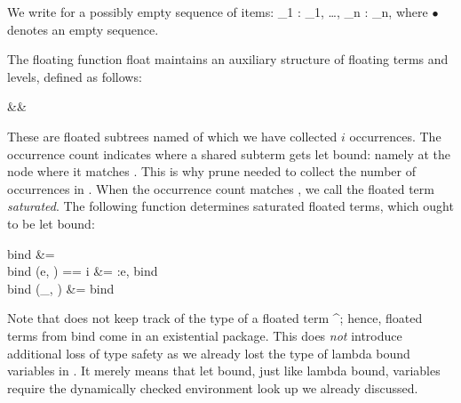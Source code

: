 We write \<\overline{\nu : \uT}\> for a possibly empty sequence of items: \<\nu_1 : \uT_1, \ldots, \nu_n : \uT_n\>, where $\bullet$ denotes an empty sequence. 

The floating function \<float\> maintains an auxiliary structure of floating terms and levels, defined as follows:
%
\begin{haskell*}
  \Gamma &{}\to{}& \float{} 
          {}\mid{} \float{}\cdot
          {}\mid{} \float{}\ell
\end{haskell*}
%
These are floated subtrees named \<\nu\> of which we have collected $i$ occurrences. The occurrence count indicates where a shared subterm gets let bound: namely at the node where it matches \<\Omega\nu\>. This is why \<prune\> needed to collect the number of occurrences in \<\Omega\>. When the occurrence count matches \<\Omega\nu\>, we call the floated term \emph{saturated}. The following function determines saturated floated terms, which ought to be let bound:
%
\begin{haskell}
  bind \Omega \bullet                             &= \bullet \\
  bind \Omega (\float{}e, \overline\Gamma)
    \mid \Omega\nu == i                           &= \nu:e, bind \Omega \overline\Gamma \\
  bind \Omega (\float{}\_, \overline\Gamma)   &= bind \Omega \overline\Gamma
\end{haskell}
%
Note that \<\Gamma\> does not keep track of the type \<\tau\> of a floated term \<\uT^\tau\>; hence, floated terms from \<bind\> come in an existential package. This does \emph{not} introduce additional loss of type safety as we already lost the type of lambda bound variables in \<\float{}\ell\>. It merely means that let bound, just like lambda bound, variables require the dynamically checked environment look up we already discussed.

